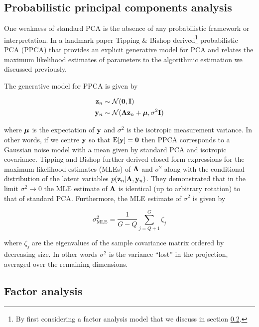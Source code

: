 \subsection{Probabilistic principal components analysis}

One weakness of standard PCA is the absence of any probabilistic framework or interpretation. In a landmark paper \cite{tipping1999probabilistic} Tipping \& Bishop derived\footnote{By first considering a factor analysis model that we discuss in section \ref{sec:intr:fa}.} probabilistic PCA (PPCA) that provides an explicit generative model for PCA and relates the maximum likelihood estimates of parameters to the algorithmic estimation we discussed previously.

The generative model for PPCA is given by

\begin{equation}
  \begin{aligned}
    \mathbf{z}_n & \sim \mathcal{N}(\bm{0}, \mathbf{I}) \\
    \mathbf{y}_n & \sim \mathcal{N}(\bm{\Lambda} \mathbf{z}_n + \bm{\mu}, \sigma^2 \mathbf{I})
  \end{aligned}
\end{equation}

where $\bm{\mu}$ is the expectation of $\mathbf{y}$ and $\sigma^2$ is the isotropic measurement variance. In other words, if we centre $\mathbf{y}$ so that $\text{E}[\mathbf{y}] = \bm{0}$ then PPCA corresponds to a Gaussian noise model with a mean given by standard PCA and isotropic covariance. Tipping and Bishop further derived closed form expressions for the maximum likelihood estimates (MLEs) of $\bm{\Lambda}$ and $\sigma^2$ along with the conditional distribution of the latent variables $p(\mathbf{z}_n | \bm{\Lambda}, \mathbf{y}_n)$. They demonstrated that in the limit $\sigma^2 \rightarrow 0$ the MLE estimate of $\bm{\Lambda}$ is identical (up to arbitrary rotation) to that of standard PCA. Furthermore, the MLE estimate of $\sigma^2$ is given by

\begin{equation}
  \sigma^2_{\text{MLE}} = \frac{1}{G-Q} \sum_{j = Q + 1}^G \zeta_j
\end{equation}

where $\zeta_j$ are the eigenvalues of the sample covariance matrix ordered by decreasing size. In other words $\sigma^2$ is the variance ``lost'' in the projection, averaged over the remaining dimensions.

\subsection{Factor analysis} \label{sec:intr:fa}

